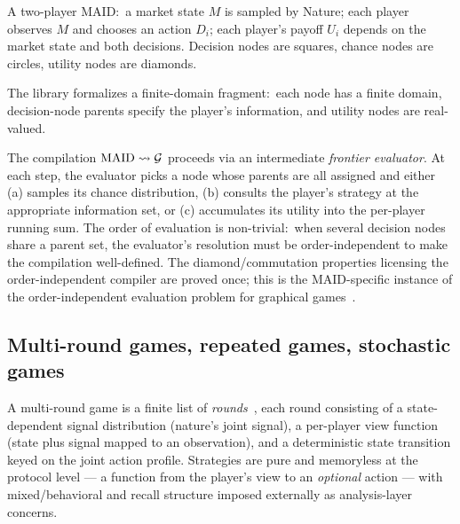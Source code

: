 \noindent
A two-player MAID:\ a market state $M$ is sampled by Nature; each
player observes $M$ and chooses an action $D_i$; each player's
payoff $U_i$ depends on the market state and both decisions.
Decision nodes are squares, chance nodes are circles, utility
nodes are diamonds.

The library formalizes a finite-domain fragment:\ each node has a
finite domain, decision-node parents specify the player's
information, and utility nodes are real-valued.

The compilation $\mathrm{MAID} \rightsquigarrow \mathcal{G}$ proceeds via an
intermediate \emph{frontier evaluator}.  At each step, the
evaluator picks a node whose parents are all assigned and either
(a) samples its chance distribution, (b) consults the player's
strategy at the appropriate information set, or (c) accumulates
its utility into the per-player running sum.  The order of
evaluation is non-trivial:\ when several decision nodes share a
parent set, the evaluator's resolution must be order-independent
to make the compilation well-defined.  The diamond/commutation
properties licensing the order-independent compiler are proved
once; this is the MAID-specific instance of the order-independent
evaluation problem for graphical games~\citep{KollerMilch2003}.



\subsection{Multi-round games, repeated games, stochastic games}
\label{sec:languages:multiround}

A multi-round game is a finite list of
\emph{rounds}~\citep{ShohamLeytonBrown2008}, each round consisting
of a state-dependent signal distribution (nature's joint signal),
a per-player view function (state plus signal mapped to an
observation), and a deterministic state transition keyed on the
joint action profile.  Strategies are pure and memoryless at the
protocol level — a function from the player's view to an
\emph{optional} action — with mixed/behavioral and recall
structure imposed externally as analysis-layer concerns.

